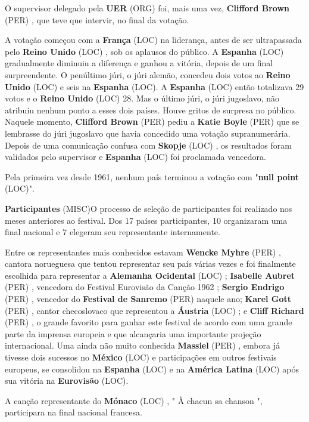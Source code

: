 \documentclass[12pt,a4paper]{article}
\begin{document}
O supervisor delegado pela \textbf{UER} (ORG) foi, mais uma vez, \textbf{Clifford Brown} (PER) , que teve que intervir, no final da votação.

A votação começou com a \textbf{França} (LOC) na liderança, antes de ser ultrapassada pelo \textbf{Reino Unido} (LOC) , sob os aplausos do público. A \textbf{Espanha} (LOC) gradualmente diminuiu a diferença e ganhou a vitória, depois de um final surpreendente. O penúltimo júri, o júri alemão, concedeu dois votos ao \textbf{Reino Unido} (LOC) e seis na \textbf{Espanha} (LOC). A \textbf{Espanha} (LOC) então totalizava 29 votos e o \textbf{Reino Unido} (LOC) 28. Mas o último júri, o júri jugoslavo, não atribuiu nenhum ponto a esses dois países. Houve gritos de surpresa no público. Naquele momento, \textbf{Clifford Brown} (PER) pediu a \textbf{Katie Boyle} (PER) que se lembrasse do júri jugoslavo que havia concedido uma votação supranumerária. Depois de uma comunicação confusa com \textbf{Skopje} (LOC) , os resultados foram validados pelo supervisor e \textbf{Espanha} (LOC) foi proclamada vencedora.

Pela primeira vez desde 1961, nenhum país terminou a votação com "\textbf{null point} (LOC)".



\textbf{Participantes} (MISC)O processo de seleção de participantes foi realizado nos meses anteriores ao festival. Dos 17 países participantes, 10 organizaram uma final nacional e 7 elegeram seu representante internamente.

Entre os representantes mais conhecidos estavam \textbf{Wencke Myhre} (PER) , cantora norueguesa que tentou representar seu país várias vezes e foi finalmente escolhida para representar a \textbf{Alemanha Ocidental} (LOC) ; \textbf{Isabelle Aubret} (PER) , vencedora do Festival Eurovisão da Canção 1962 ; \textbf{Sergio Endrigo} (PER) , vencedor do \textbf{Festival de Sanremo} (PER) naquele ano; \textbf{Karel Gott} (PER) , cantor checoslovaco que representou a \textbf{Áustria} (LOC) ; e \textbf{Cliff Richard} (PER) , o grande favorito para ganhar este festival de acordo com uma grande parte da imprensa europeia e que alcançaria uma importante projeção internacional. Uma ainda não muito conhecida \textbf{Massiel} (PER) , embora já tivesse dois sucessos no \textbf{México} (LOC) e participações em outros festivais europeus, se consolidou na \textbf{Espanha} (LOC) e na \textbf{América Latina} (LOC) após sua vitória na \textbf{Eurovisão} (LOC).

A canção representante do \textbf{Mónaco} (LOC) , " À chacun sa chanson ", participara na final nacional francesa.
\end{document}
